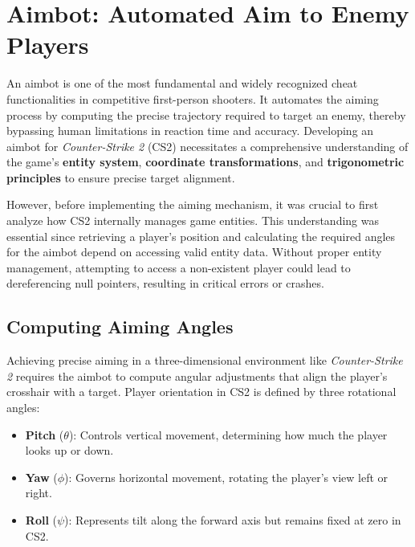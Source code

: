 

\newpage


\section{Aimbot: Automated Aim to Enemy Players}


An aimbot is one of the most fundamental and widely recognized cheat functionalities in competitive first-person shooters. It automates the aiming process by computing the precise trajectory required to target an enemy, thereby bypassing human limitations in reaction time and accuracy. Developing an aimbot for \textit{Counter-Strike 2} (CS2) necessitates a comprehensive understanding of the game’s \textbf{entity system}, \textbf{coordinate transformations}, and \textbf{trigonometric principles} to ensure precise target alignment.

However, before implementing the aiming mechanism, it was crucial to first analyze how CS2 internally manages game entities. This understanding was essential since retrieving a player's position and calculating the required angles for the aimbot depend on accessing valid entity data. Without proper entity management, attempting to access a non-existent player could lead to dereferencing null pointers, resulting in critical errors or crashes.


\subsection{Computing Aiming Angles}

Achieving precise aiming in a three-dimensional environment like \textit{Counter-Strike 2} requires the aimbot to compute angular adjustments that align the player's crosshair with a target. Player orientation in CS2 is defined by three rotational angles:

\begin{itemize}
    \item \textbf{Pitch} (\(\theta\)): Controls vertical movement, determining how much the player looks up or down.
    \item \textbf{Yaw} (\(\phi\)): Governs horizontal movement, rotating the player's view left or right.
    \item \textbf{Roll} (\(\psi\)): Represents tilt along the forward axis but remains fixed at zero in CS2.
\end{itemize}

